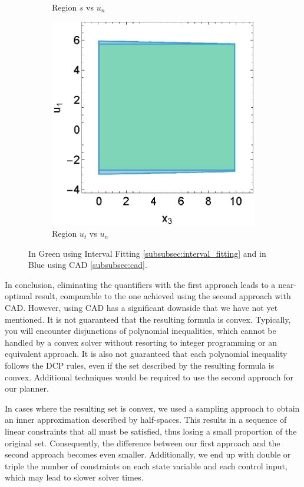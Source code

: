 \begin{figure}[h]
\begin{subfigure}[b]{0.32\textwidth}
		\caption{Region $\dot{s}$ vs $u_n$}
	\end{subfigure}
	\begin{subfigure}[b]{0.32\textwidth}
		\centering
		\includegraphics[width=\textwidth]{figures/inner_polytope/plot_gr1.eps}
		\caption{Region $u_t$ vs $u_n$}
	\end{subfigure}
	\caption{In Green using Interval Fitting \ref{subsubsec:interval_fitting} and in Blue using CAD \ref{subsubsec:cad}.}
	\label{fig:qe-comparison}
\end{figure}

In conclusion, eliminating the quantifiers with the first approach leads to a near-optimal result, comparable to the one achieved using the second
approach with CAD.
However, using CAD has a significant downside that we have not yet mentioned.
It is not guaranteed that the resulting formula is convex.
Typically, you will encounter disjunctions of polynomial inequalities, which cannot be handled by a convex solver without resorting to integer
programming or an equivalent approach.
It is also not guaranteed that each polynomial inequality follows the DCP rules, even if the set described by the resulting formula is convex.
Additional techniques would be required to use the second approach for our planner.

In cases where the resulting set is convex, we used a sampling approach to obtain an inner approximation described by half-spaces.
This results in a sequence of linear constraints that all must be satisfied, thus losing a small proportion of the original set.
Consequently, the difference between our first approach and the second approach becomes even smaller.
Additionally, we end up with double or triple the number of constraints on each state variable and each control input, which may lead to slower
solver times.

